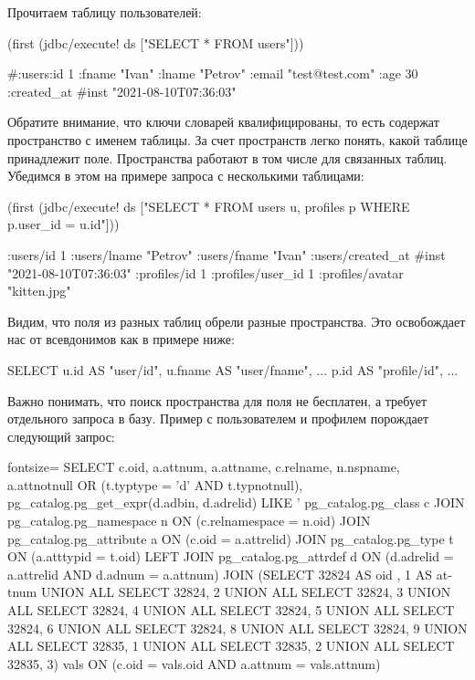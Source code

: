 Прочитаем таблицу пользователей:

\begin{english}
  \begin{clojure}
(first (jdbc/execute! ds ["SELECT * FROM users"]))

#:users{:id 1
        :fname "Ivan"
        :lname "Petrov"
        :email "test@test.com"
        :age 30
        :created_at #inst "2021-08-10T07:36:03"}
  \end{clojure}
\end{english}

Обратите внимание, что ключи словарей квалифицированы, то есть содержат пространство с именем таблицы. За счет пространств легко понять, какой таблице принадлежит поле. Пространства работают в том числе для связанных таблиц. Убедимся в этом на примере запроса с несколькими таблицами:

\begin{english}
  \begin{clojure}
(first
  (jdbc/execute! ds
    ["SELECT *
      FROM users u, profiles p
      WHERE p.user_id = u.id"]))

{:users/id 1
 :users/lname "Petrov"
 :users/fname "Ivan"
 :users/created_at #inst "2021-08-10T07:36:03"
 :profiles/id 1
 :profiles/user_id 1
 :profiles/avatar "kitten.jpg"}
  \end{clojure}
\end{english}

Видим, что поля из разных таблиц обрели разные пространства. Это освобождает нас от всевдонимов как в примере ниже:

\begin{english}
  \begin{sql}
SELECT
  u.id     AS "user/id",
  u.fname  AS "user/fname",
  ...
  p.id     AS "profile/id",
  ...
  \end{sql}
\end{english}

Важно понимать, что поиск пространства для поля не бесплатен, а требует отдельного запроса в базу. Пример с пользователем и профилем порождает следующий запрос:

\begin{english}
  \begin{sql*}{fontsize=\small}
SELECT c.oid, a.attnum, a.attname, c.relname, n.nspname,
a.attnotnull OR (t.typtype = 'd' AND t.typnotnull),
pg_catalog.pg_get_expr(d.adbin, d.adrelid) LIKE '%
pg_catalog.pg_class c JOIN pg_catalog.pg_namespace n
ON (c.relnamespace = n.oid) JOIN pg_catalog.pg_attribute a
ON (c.oid = a.attrelid) JOIN pg_catalog.pg_type t ON (a.atttypid
= t.oid) LEFT JOIN pg_catalog.pg_attrdef d ON (d.adrelid =
a.attrelid AND d.adnum = a.attnum) JOIN (SELECT 32824 AS oid , 1
AS attnum UNION ALL SELECT 32824, 2 UNION ALL SELECT 32824, 3
UNION ALL SELECT 32824, 4 UNION ALL SELECT 32824, 5 UNION ALL
SELECT 32824, 6 UNION ALL SELECT 32824, 8 UNION ALL SELECT 32824,
9 UNION ALL SELECT 32835, 1 UNION ALL SELECT 32835, 2 UNION ALL
SELECT 32835, 3) vals ON (c.oid = vals.oid AND a.attnum =
vals.attnum)
  \end{sql*}
\end{english}


